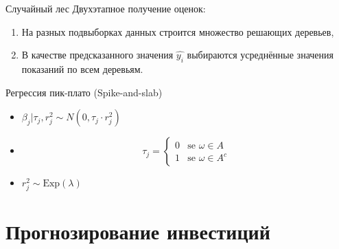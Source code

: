 \documentclass[c, dvipsnames]{beamer}  %
\begin{document}
\begin{frame}
\frametitle{\insertsection} 
\begin{block}{Случайный лес}
    Двухэтапное получение оценок:
    \begin{enumerate}
        \item На разных подвыборках данных строится множество решающих деревьев,
        \item В качестве предсказанного значения $\hat{y_i}$ выбираются усреднённые значения показаний по всем деревьям.
    \end{enumerate}
\end{block}

\begin{block}{Регрессия пик-плато (Spike-and-slab)}

    \begin{itemize}
        \item $\beta_j|\tau_j, r^2_j \sim N(0,\tau_j\cdot r^2_j )$
        \item \begin{equation}
             \tau_j = 
 \begin{cases}
   0 &\text{se $\omega\in A$}\\
   1 &\text{se $\omega \in A^c$}
 \end{cases}
        \end{equation}
        \item $r^2_j \sim \text{Exp}(\lambda)$ 
    \end{itemize}
    
    
\end{block}


\end{frame}

\section{Прогнозирование инвестиций}
\end{document}
